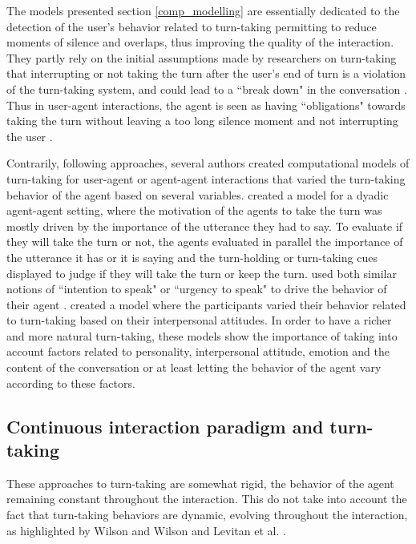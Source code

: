 The models presented section \ref{comp_modelling} are essentially dedicated to the detection of the user's behavior related to turn-taking permitting
to reduce moments of silence and overlaps, thus improving the quality of the interaction. They partly rely on the initial assumptions made by researchers on
turn-taking that interrupting or not taking
the turn after the user's end of turn is a violation
of the turn-taking system, and could lead to a ``break
down" in the conversation \citep{cutler_analysis_1986}. Thus in user-agent interactions,
the agent is seen as having ``obligations" towards
taking the turn without leaving a too long silence
moment and not interrupting the user \citep{de_kok_multimodal_2009}.

Contrarily, following \citep{oconnell_turn-taking_1990,clark_using_1996} approaches,  several authors created computational models of
turn-taking for user-agent or agent-agent interactions
that varied the turn-taking behavior of the agent based
on several variables. \citep{selfridge_bidding_2009} created a model for a dyadic
agent-agent setting, where the motivation of the agents
to take the turn was mostly driven by the importance
of the utterance they had to say. To evaluate if they
will take the turn or not, the agents evaluated in parallel
the importance of the utterance it has or it is saying
and the turn-holding or turn-taking cues displayed to
judge if they will take the turn or keep the turn. \citep{lessmann_towards_2004,thorisson_multiparty_2010}
used both similar notions of ``intention to speak" \citep{lessmann_towards_2004} or
``urgency to speak" to drive the behavior of their agent
\citep{thorisson_multiparty_2010}. \citep{ravenet_conversational_2015} created a model where the participants varied
their behavior related to turn-taking based on their interpersonal
attitudes. In order to have a richer and more
natural turn-taking, these models show the importance
of taking into account factors related to personality,
interpersonal attitude, emotion and the content of the
conversation or at least letting the behavior of the agent
vary according to these factors.

\subsection{Continuous interaction paradigm and turn-taking}

These approaches to turn-taking are somewhat rigid, the behavior of the agent remaining constant throughout the interaction. This do not take into account the fact that turn-taking behaviors are dynamic, evolving throughout the interaction, as highlighted by Wilson and Wilson \citep{wilson_oscillators_2005} and Levitan et al. 
 \citep{levitan_entrainmnent_2015}.  
  
